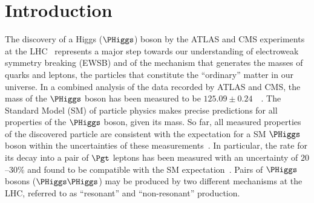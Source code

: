 \section{Introduction}
\label{sec:introduction}

The discovery of a Higgs ($\PHiggs$) boson by the ATLAS and CMS experiments at the LHC~\cite{Higgs-Discovery_CMS,Higgs-Discovery_ATLAS}
represents a major step towards our understanding of electroweak symmetry breaking (EWSB) 
and of the mechanism that generates the masses of quarks and leptons, the particles that constitute the ``ordinary'' matter in our universe.
In a combined analysis of the data recorded by ATLAS and CMS, 
the mass of the $\PHiggs$ boson has been measured to be $125.09 \pm 0.24$~\GeV~\cite{HIG-14-042}.
The Standard Model (SM) of particle physics makes precise predictions for all properties of the $\PHiggs$ boson, given its mass.
So far, all measured properties of the discovered particle are consistent with the expectation for a SM $\PHiggs$ boson within the uncertainties of these measurements~\cite{HIG-15-002}.
In particular, the rate for its decay into a pair of $\Pgt$ leptons has been measured with an uncertainty of $20$--$30\%$
and found to be compatible with the SM expectation~\cite{HIG-13-004,Aad:2015vsa,HIG-15-002,HIG-16-043,ATLAS:2018lur}.
Pairs of $\PHiggs$ bosons ($\PHiggs\PHiggs$) may be produced by two different mechanisms at the LHC,
referred to as ``resonant'' and ``non-resonant'' production.

